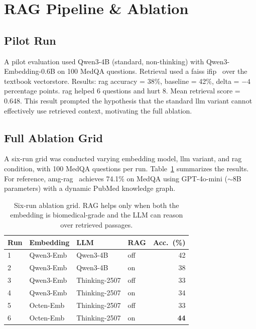 \section{RAG Pipeline \& Ablation}
\label{sec:ablation}

\subsection{Pilot Run}

A pilot evaluation used Qwen3-4B (standard, non-thinking) with Qwen3-Embedding-0.6B on 100 MedQA questions. Retrieval used a \gls{faiss} \gls{ifip}~\cite{johnson_billionscale_2019} over the textbook vectorstore. Results: \gls{rag} accuracy = 38\%, baseline = 42\%, delta = $-4$ percentage points. \gls{rag} helped 6 questions and hurt 8. Mean retrieval score = 0.648. This result prompted the hypothesis that the standard \gls{llm} variant cannot effectively use retrieved context, motivating the full ablation.

\subsection{Full Ablation Grid}

A six-run grid was conducted varying embedding model, \gls{llm} variant, and \gls{rag} condition, with 100 MedQA questions per run. Table~\ref{tab:ablation} summarizes the results. For reference, \gls{amg-rag}~\cite{rezaei_agentic_2025} achieves 74.1\% on MedQA using GPT-4o-mini ($\sim$8B parameters) with a dynamic PubMed knowledge graph.

\begin{table}[H]
  \caption{Six-run ablation grid. RAG helps only when both the embedding is
    biomedical-grade and the LLM can reason over retrieved passages.}
  \label{tab:ablation}
  \begin{tabular}{llllr}
    \toprule
    Run & Embedding & LLM & RAG & Acc.\ (\%) \\
    \midrule
    1 & Qwen3-Emb   & Qwen3-4B          & off & 42 \\
    2 & Qwen3-Emb   & Qwen3-4B          & on  & 38 \\
    3 & Qwen3-Emb   & Thinking-2507     & off & 33 \\
    4 & Qwen3-Emb   & Thinking-2507     & on  & 34 \\
    5 & Octen-Emb   & Thinking-2507     & off & 33 \\
    6 & Octen-Emb   & Thinking-2507     & on  & \textbf{44} \\
    \bottomrule
  \end{tabular}
\end{table}

